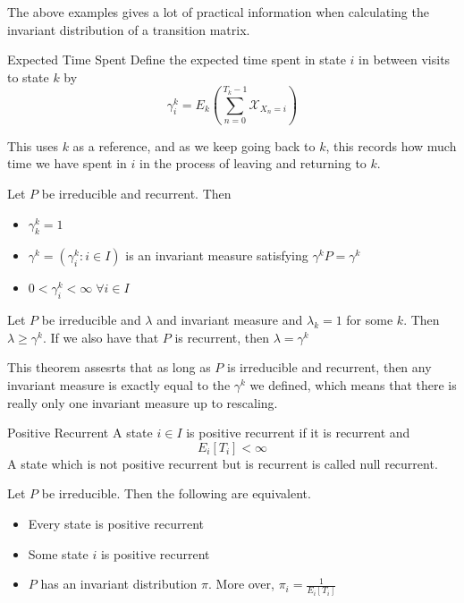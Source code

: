 \documentclass[a4paper]{article}
\begin{document}
The above examples gives a lot of practical information when calculating the invariant distribution of a transition matrix. 

\begin{defn}{Expected Time Spent}{} Define the expected time spent in state $i$ in between visits to state $k$ by $$\gamma_i^k=E_k\left(\sum_{n=0}^{T_k-1}\mathcal{X}_{X_n=i}\right)$$
\end{defn}

This uses $k$ as a reference, and as we keep going back to $k$, this records how much time we have spent in $i$ in the process of leaving and returning to $k$. 

\begin{thm}{}{} Let $P$ be irreducible and recurrent. Then
\begin{itemize}
\item $\gamma_k^k=1$
\item $\gamma^k=(\gamma_i^k:i\in I)$ is an invariant measure satisfying $\gamma^kP=\gamma^k$
\item $0<\gamma_i^k<\infty\;\forall i\in I$
\end{itemize}
\end{thm}

\begin{thm}{}{} Let $P$ be irreducible and $\lambda$ and invariant measure and $\lambda_k=1$ for some $k$. Then $\lambda\geq\gamma^k$. If we also have that $P$ is recurrent, then $\lambda=\gamma^k$
\end{thm}

This theorem assesrts that as long as $P$ is irreducible and recurrent, then any invariant measure is exactly equal to the $\gamma^k$ we defined, which means that there is really only one invariant measure up to rescaling. 

\begin{defn}{Positive Recurrent}{} A state $i\in I$ is positive recurrent if it is recurrent and $$E_i[T_i]<\infty$$ A state which is not positive recurrent but is recurrent is called null recurrent. 
\end{defn}

\begin{thm}{}{} Let $P$ be irreducible. Then the following are equivalent. 
\begin{itemize}
\item Every state is positive recurrent
\item Some state $i$ is positive recurrent
\item $P$ has an invariant distribution $\pi$. More over, $\pi_i=\frac{1}{E_i[T_i]}$
\end{itemize}
\end{thm}
\end{document}
